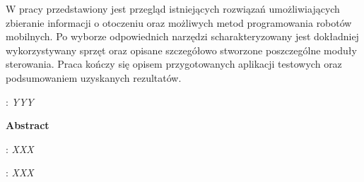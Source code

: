 \begin{titlepage}
{    W pracy przedstawiony jest przegląd istniejących rozwiązań umożliwiających
    zbieranie informacji o otoczeniu oraz możliwych metod programowania
    robotów mobilnych. Po wyborze odpowiednich narzędzi scharakteryzowany jest 
    dokładniej wykorzystywany sprzęt oraz opisane szczegółowo stworzone poszczególne
    moduły sterowania. Praca kończy się opisem przygotowanych aplikacji testowych
    oraz podsumowaniem uzyskanych rezultatów.
    }
    \vspace*{1\baselineskip}

    : {\itshape YYY }
    \par
    \vspace{4\baselineskip}
    \begin{center}
	{\large\bfseries Abstract}\par\bigskip
    \end{center}
    : {\itshape XXX}\par
    \vspace*{1\baselineskip}
    {\itshape

    }
    \vspace*{1\baselineskip}

    : {\itshape XXX}

\end{titlepage}
